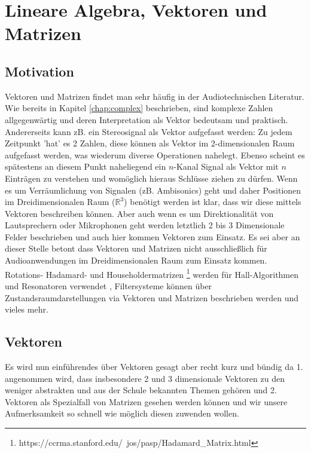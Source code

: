 \chapter{Lineare Algebra, Vektoren und Matrizen}

\citep{strang2020linear}


\section{Motivation}
Vektoren und Matrizen findet man sehr häufig in der Audiotechnischen Literatur. Wie bereits in Kapitel \ref{chap:complex} beschrieben, sind komplexe Zahlen allgegenwärtig und deren Interpretation als Vektor bedeutsam und praktisch. Andererseits kann zB. ein Stereosignal als Vektor aufgefasst werden: Zu jedem Zeitpunkt 'hat' es 2 Zahlen, diese können als Vektor im 2-dimensionalen Raum aufgefasst werden, was wiederum diverse Operationen nahelegt. Ebenso scheint es spätestens an diesem Punkt naheliegend ein $n$-Kanal Signal als Vektor mit $n$ Einträgen zu verstehen und womöglich hieraus Schlüsse ziehen zu dürfen. Wenn es um Verräumlichung von Signalen (zB. Ambisonics) geht und daher Positionen im Dreidimensionalen Raum ($\mathbb{R}^3$) benötigt werden ist klar, dass wir diese mittels Vektoren beschreiben können. Aber auch wenn es um Direktionalität von Lautsprechern oder Mikrophonen geht werden letztlich 2 bis 3 Dimensionale Felder beschrieben und auch hier kommen Vektoren zum Einsatz. Es sei aber an dieser Stelle betont dass Vektoren und Matrizen nicht ausschließlich für Audioanwendungen im Dreidimensionalen Raum zum Einsatz kommen. Rotations- Hadamard- und Householdermatrizen \citep{PASPWEB2010}\footnote{https://ccrma.stanford.edu/~jos/pasp/Hadamard\_Matrix.html} werden für Hall-Algorithmen und Resonatoren verwendet , Filtersysteme können über Zustandsraumdarstellungen via Vektoren und Matrizen beschrieben werden \citep{bilbao2009numerical} und vieles mehr.       

\section{Vektoren}
Es wird nun einführendes über Vektoren gesagt aber recht kurz und bündig da 1. angenommen wird, dass insbesondere 2 und 3 dimensionale Vektoren zu den weniger abstrakten und aus der Schule bekannten Themen gehören und 2. Vektoren als Spezialfall von Matrizen gesehen werden können und wir unsere Aufmerksamkeit so schnell wie möglich diesen zuwenden wollen.

